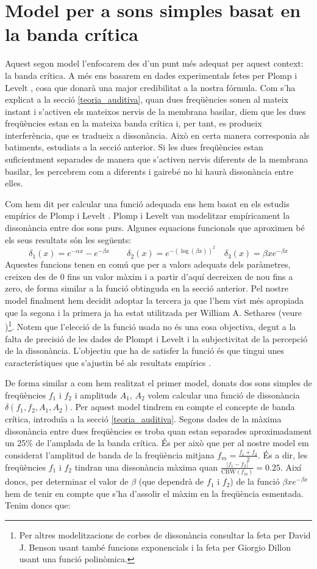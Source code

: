 \documentclass{article}
\theoremstyle{definition}
\begin{document}
\section{Model per a sons simples basat en la banda crítica}
Aquest segon model l'enfocarem des d'un punt més adequat per aquest context: la banda crítica. A més ens basarem en dades experimentals fetes per Plomp i Levelt \cite{plomp}, cosa que donarà una major credibilitat a la nostra fórmula. Com s'ha explicat a la secció \ref{teoria_auditiva}, quan dues freqüències sonen al mateix instant i s'activen els mateixos nervis de la membrana basilar, diem que les dues freqüències estan en la mateixa banda crítica i, per tant, es produeix interferència, que es tradueix a dissonància. Això en certa manera corresponia als batiments, estudiats a la secció anterior. Si les dues freqüències estan suficientment separades de manera que s'activen nervis diferents de la membrana basilar, les percebrem com a diferents i gairebé no hi haurà dissonància entre elles.\par 
Com hem dit per calcular una funció adequada ens hem basat en els estudis empírics de Plomp i Levelt \cite{plomp}. Plomp i Levelt van modelitzar empíricament la dissonància entre dos sons purs. Algunes equacions funcionals que aproximen bé els seus resultats són les següents: $$\delta_1(x)=e^{-\alpha x}-e^{-\beta x}\qquad\delta_2(x)=e^{-\left(\log(\beta x)\right)^2}\quad\delta_3(x)=\beta xe^{-\beta x}$$
Aquestes funcions tenen en comú que per a valors adequats dels paràmetres, creixen des de 0 fins un valor màxim i a partir d'aquí decreixen de nou fins a zero, de forma similar a la funció obtinguda en la secció anterior. Pel nostre model finalment hem decidit adoptar la tercera ja que l'hem vist més apropiada que la segona i la primera ja ha estat utilitzada per William A. Sethares (veure \cite{sethares1})\footnote{Per altres modelitzacions de corbes de dissonància consultar la feta per David J. Benson \cite{benson} usant també funcions exponencials i la feta per Giorgio Dillon \cite{dillon} usant una funció polinòmica.}. Notem que l'elecció de la funció usada no és una cosa objectiva, degut a la falta de precisió de les dades de Plompt i Levelt i la subjectivitat de la percepció de la dissonància. L'objectiu que ha de satisfer la funció és que tingui unes característiques que s'ajustin bé als resultats empírics \cite{benson}.\par
De forma similar a com hem realitzat el primer model, donats dos sons simples de freqüències $f_1$ i $f_2$ i amplituds $A_1$, $A_2$ volem calcular una funció de dissonància $\delta(f_1,f_2,A_1,A_2)$. Per aquest model tindrem en compte el concepte de banda crítica, introduïa a la secció \ref{teoria_auditiva}. Segons dades de \cite{zwicker} la màxima dissonància entre dues freqüències es troba quan estan separades aproximadament un 25\% de l'amplada de la banda crítica. És per això que per al nostre model em considerat l'amplitud de banda de la freqüència mitjana $f_m=\frac{f_1+f_2}{2}$. És a dir, les freqüències $f_1$ i $f_2$ tindran una dissonància màxima quan $\frac{|f_1-f_2|}{\text{CBW}(f_m)}=0.25$. Així doncs, per determinar el valor de $\beta$ (que dependrà de $f_1$ i $f_2$) de la funció $\beta xe^{-\beta x}$ hem de tenir en compte que s'ha d'assolir el màxim en la freqüència esmentada. Tenim doncs que:
\end{document}
